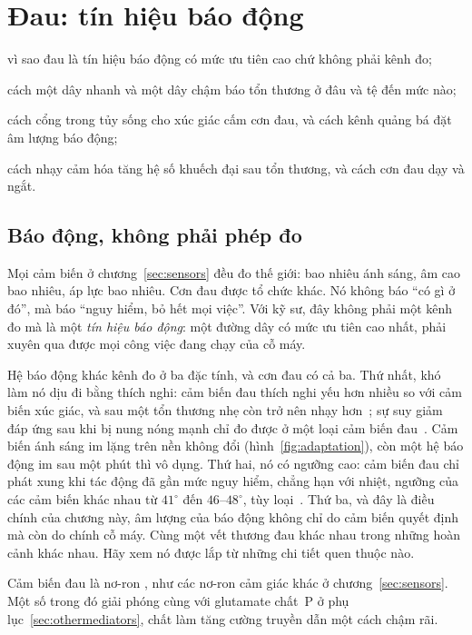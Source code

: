 \chapter{Đau: tín hiệu báo động}
\label{sec:pain}
\begin{chaptergoals}
\item vì sao đau là tín hiệu báo động có mức ưu tiên cao chứ không phải kênh đo;
\item cách một dây nhanh và một dây chậm báo tổn thương ở đâu và tệ đến mức nào;
\item cách cổng trong tủy sống cho xúc giác cấm cơn đau, và cách kênh quảng bá đặt âm lượng báo động;
\item cách nhạy cảm hóa tăng hệ số khuếch đại sau tổn thương, và cách cơn đau dạy và ngắt.
\end{chaptergoals}

\section{Báo động, không phải phép đo}

Mọi cảm biến ở chương~\ref{sec:sensors} đều đo thế giới: bao nhiêu ánh sáng, âm cao bao nhiêu, áp lực bao nhiêu. Cơn đau được tổ chức khác. Nó không báo ``có gì ở đó'', mà báo ``nguy hiểm, bỏ hết mọi việc''. Với kỹ sư, đây không phải một kênh đo mà là một \emph{tín hiệu báo động}: một đường dây có mức ưu tiên cao nhất, phải xuyên qua được mọi công việc đang chạy của cỗ máy.

Hệ báo động khác kênh đo ở ba đặc tính, và cơn đau có cả ba. Thứ nhất, khó làm nó dịu đi bằng thích nghi: cảm biến đau thích nghi yếu hơn nhiều so với cảm biến xúc giác, và sau một tổn thương nhẹ còn trở nên nhạy hơn~\cite{LaMotte1982hyper}; sự suy giảm đáp ứng sau khi bị nung nóng mạnh chỉ đo được ở một loại cảm biến đau~\cite{Treede1995heat}. Cảm biến ánh sáng im lặng trên nền không đổi (hình~\ref{fig:adaptation}), còn một hệ báo động im sau một phút thì vô dụng. Thứ hai, nó có ngưỡng cao: cảm biến đau chỉ phát xung khi tác động đã gần mức nguy hiểm, chẳng hạn với nhiệt, ngưỡng của các cảm biến khác nhau từ $41^\circ$ đến $46$--$48^\circ$, tùy loại~\cite{Treede1995heat, Weidner1999cfib}. Thứ ba, và đây là điều chính của chương này, âm lượng của báo động không chỉ do cảm biến quyết định mà còn do chính cỗ máy. Cùng một vết thương đau khác nhau trong những hoàn cảnh khác nhau. Hãy xem nó được lắp từ những chi tiết quen thuộc nào.

Cảm biến đau là nơ-ron , như các nơ-ron cảm giác khác ở chương~\ref{sec:sensors}. Một số trong đó giải phóng cùng với glutamate chất~P ở phụ lục~\ref{sec:othermediators}, chất làm tăng cường truyền dẫn một cách chậm rãi.


